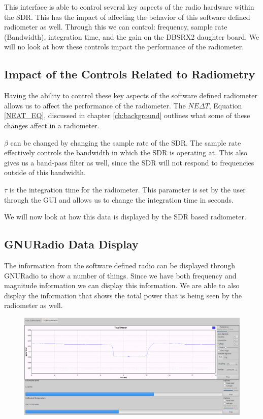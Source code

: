 This interface is able to control several key aspects of the radio hardware within the SDR.  This has the impact of affecting the behavior of this software defined radiometer as well.  Through this we can control: frequency, sample rate (Bandwidth), integration time, and the gain on the DBSRX2 daughter board.  We will no look at how these controls impact the performance of the radiometer.  

\subsection{Impact of the Controls Related to Radiometry}

Having the ability to control these key aspects of the software defined radiometer allows us to affect the performance of the radiometer.  The $NE\Delta T$, Equation \ref{NEAT_EQ}, discussed in chapter \ref{ch:background} outlines what some of these changes affect in a radiometer.

$\beta$ can be changed by changing the sample rate of the SDR.  The sample rate effectively controls the bandwidth in which the SDR is operating at.  This also gives us a band-pass filter as well, since the SDR will not respond to frequencies outside of this bandwidth.  

$\tau$ is the integration time for the radiometer.  This parameter is set by the user through the GUI and allows us to change the integration time in seconds.

We will now look at how this data is displayed by the SDR based radiometer.

\subsection{GNURadio Data Display}
The information from the software defined radio can be displayed through GNURadio to show a number of things.  Since we have both frequency and magnitude information we can display this information.  We are able to also display the information that shows the total power that is being seen by the radiometer as well.

{\begin{figure}[h!tb] 
\centering
\includegraphics[width=17cm]{Images/Lab1_TPR_at_end_exp.png}
\label{radiometer_tpr_display}
\end{figure}
}

